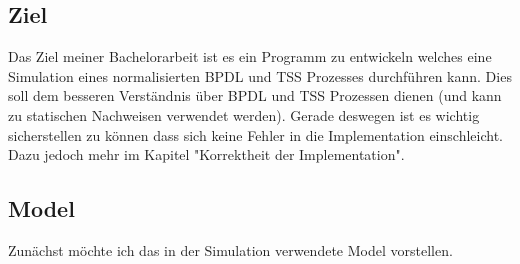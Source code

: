 \documentclass{article}
\begin{document}
	\subsection{Ziel}
		Das Ziel meiner Bachelorarbeit ist es ein Programm zu entwickeln welches eine Simulation eines normalisierten BPDL und TSS Prozesses durchführen kann. Dies soll dem besseren Verständnis über BPDL und TSS Prozessen dienen (und kann zu statischen Nachweisen verwendet werden). Gerade deswegen ist es wichtig sicherstellen zu können dass sich keine Fehler in die Implementation einschleicht. Dazu jedoch mehr im Kapitel "{}Korrektheit der Implementation"{}.
	\subsection{Model}
		Zunächst möchte ich das in der Simulation verwendete Model vorstellen.\\
\end{document}
